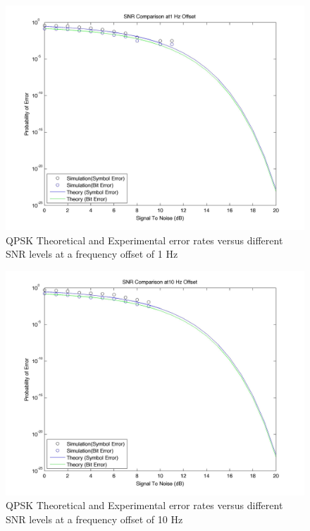 \documentclass[]{article}
\begin{document}
\begin{figure}[H]
\centering
\hspace*{-2cm}\includegraphics[width=1.3\textwidth]{qpSNRfo3.jpg}
\caption{QPSK Theoretical and Experimental error rates versus different SNR levels at a frequency offset of 1 Hz}
\end{figure}

\begin{figure}[H]
\centering
\hspace*{-2cm}\includegraphics[width=1.3\textwidth]{qpSNRfo4.jpg}
\caption{QPSK Theoretical and Experimental error rates versus different SNR levels at a frequency offset of 10 Hz}
\end{figure}
\end{document}
